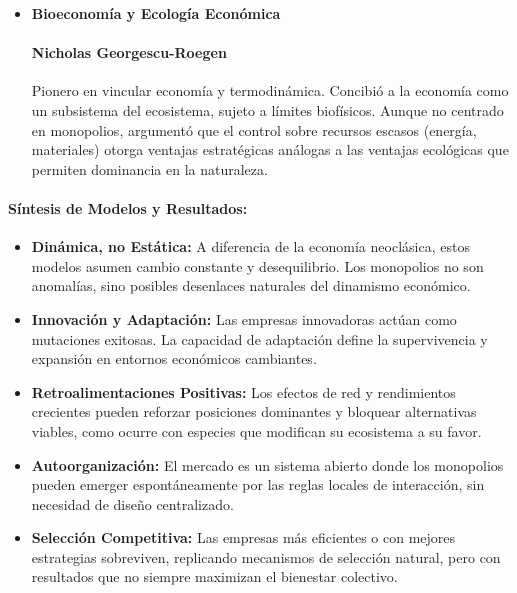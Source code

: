 \documentclass[a4paper,12pt]{article}
\begin{document}
\begin{itemize}
    \paragraph{John Holland} Aunque su enfoque fue más general, sus modelos de \textit{sistemas complejos adaptativos} (CCA) explican cómo estructuras estables —como monopolios— pueden emerger espontáneamente de la interacción de múltiples agentes simples que aprenden y se adaptan.

    \item \textbf{Bioeconomía y Ecología Económica}

    \paragraph{Nicholas Georgescu-Roegen} Pionero en vincular economía y termodinámica. Concibió a la economía como un subsistema del ecosistema, sujeto a límites biofísicos. Aunque no centrado en monopolios, argumentó que el control sobre recursos escasos (energía, materiales) otorga ventajas estratégicas análogas a las ventajas ecológicas que permiten dominancia en la naturaleza.

\end{itemize}

\paragraph{Síntesis de Modelos y Resultados:}

\begin{itemize}
    \item \textbf{Dinámica, no Estática:} A diferencia de la economía neoclásica, estos modelos asumen cambio constante y desequilibrio. Los monopolios no son anomalías, sino posibles desenlaces naturales del dinamismo económico.

    \item \textbf{Innovación y Adaptación:} Las empresas innovadoras actúan como mutaciones exitosas. La capacidad de adaptación define la supervivencia y expansión en entornos económicos cambiantes.

    \item \textbf{Retroalimentaciones Positivas:} Los efectos de red y rendimientos crecientes pueden reforzar posiciones dominantes y bloquear alternativas viables, como ocurre con especies que modifican su ecosistema a su favor.

    \item \textbf{Autoorganización:} El mercado es un sistema abierto donde los monopolios pueden emerger espontáneamente por las reglas locales de interacción, sin necesidad de diseño centralizado.

    \item \textbf{Selección Competitiva:} Las empresas más eficientes o con mejores estrategias sobreviven, replicando mecanismos de selección natural, pero con resultados que no siempre maximizan el bienestar colectivo.
\end{itemize}
\end{document}
